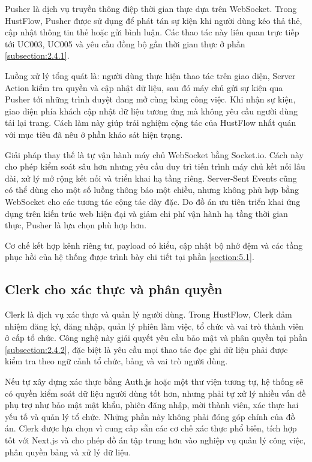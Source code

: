 \documentclass[../DoAn.tex]{subfiles}
\begin{document}
Pusher \cite{pusher} là dịch vụ truyền thông điệp thời gian thực dựa trên WebSocket. Trong HustFlow, Pusher được sử dụng để phát tán sự kiện khi người dùng kéo thả thẻ, cập nhật thông tin thẻ hoặc gửi bình luận. Các thao tác này liên quan trực tiếp tới UC003, UC005 và yêu cầu đồng bộ gần thời gian thực ở phần \ref{subsection:2.4.1}.

Luồng xử lý tổng quát là: người dùng thực hiện thao tác trên giao diện, Server Action kiểm tra quyền và cập nhật dữ liệu, sau đó máy chủ gửi sự kiện qua Pusher tới những trình duyệt đang mở cùng bảng công việc. Khi nhận sự kiện, giao diện phía khách cập nhật dữ liệu tương ứng mà không yêu cầu người dùng tải lại trang. Cách làm này giúp trải nghiệm cộng tác của HustFlow nhất quán với mục tiêu đã nêu ở phần khảo sát hiện trạng.

Giải pháp thay thế là tự vận hành máy chủ WebSocket bằng Socket.io. Cách này cho phép kiểm soát sâu hơn nhưng yêu cầu duy trì tiến trình máy chủ kết nối lâu dài, xử lý mở rộng kết nối và triển khai hạ tầng riêng. Server-Sent Events cũng có thể dùng cho một số luồng thông báo một chiều, nhưng không phù hợp bằng WebSocket cho các tương tác cộng tác dày đặc. Do đồ án ưu tiên triển khai ứng dụng trên kiến trúc web hiện đại và giảm chi phí vận hành hạ tầng thời gian thực, Pusher là lựa chọn phù hợp hơn.

Cơ chế kết hợp kênh riêng tư, payload có kiểu, cập nhật bộ nhớ đệm và các tầng phục hồi của hệ thống được trình bày chi tiết tại phần \ref{section:5.1}.

\subsection{Clerk cho xác thực và phân quyền}
\label{subsection:3.2.4}

Clerk \cite{clerk} là dịch vụ xác thực và quản lý người dùng. Trong HustFlow, Clerk đảm nhiệm đăng ký, đăng nhập, quản lý phiên làm việc, tổ chức và vai trò thành viên ở cấp tổ chức. Công nghệ này giải quyết yêu cầu bảo mật và phân quyền tại phần \ref{subsection:2.4.2}, đặc biệt là yêu cầu mọi thao tác đọc ghi dữ liệu phải được kiểm tra theo ngữ cảnh tổ chức, bảng và vai trò người dùng.

Nếu tự xây dựng xác thực bằng Auth.js hoặc một thư viện tương tự, hệ thống sẽ có quyền kiểm soát dữ liệu người dùng tốt hơn, nhưng phải tự xử lý nhiều vấn đề phụ trợ như bảo mật mật khẩu, phiên đăng nhập, mời thành viên, xác thực hai yếu tố và quản lý tổ chức. Những phần này không phải đóng góp chính của đồ án. Clerk được lựa chọn vì cung cấp sẵn các cơ chế xác thực phổ biến, tích hợp tốt với Next.js và cho phép đồ án tập trung hơn vào nghiệp vụ quản lý công việc, phân quyền bảng và xử lý dữ liệu.
\end{document}
